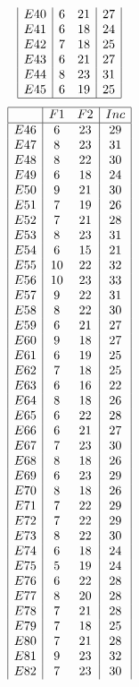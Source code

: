 \documentclass[12pt]{article}
\begin{document}
\begin{multicols}{3}
\begin{equation*}
\begin{array}{|c|cc|c|}
E40&6&21&27\\
E41&6&18&24\\
E42&7&18&25\\
E43&6&21&27\\
E44&8&23&31\\
E45&6&19&25\\
\hline
\end{array}
\end{equation*}
\begin{equation*}
\begin{array}{|c|cc|c|}
\hline
&F1&F2&Inc\\
\hline
E46&6&23&29\\
E47&8&23&31\\
E48&8&22&30\\
E49&6&18&24\\
E50&9&21&30\\
E51&7&19&26\\
E52&7&21&28\\
E53&8&23&31\\
E54&6&15&21\\
E55&10&22&32\\
E56&10&23&33\\
E57&9&22&31\\
E58&8&22&30\\
E59&6&21&27\\
E60&9&18&27\\
E61&6&19&25\\
E62&7&18&25\\
E63&6&16&22\\
E64&8&18&26\\
E65&6&22&28\\
E66&6&21&27\\
E67&7&23&30\\
E68&8&18&26\\
E69&6&23&29\\
E70&8&18&26\\
E71&7&22&29\\
E72&7&22&29\\
E73&8&22&30\\
E74&6&18&24\\
E75&5&19&24\\
E76&6&22&28\\
E77&8&20&28\\
E78&7&21&28\\
E79&7&18&25\\
E80&7&21&28\\
E81&9&23&32\\
E82&7&23&30\\

\end{array}
\end{equation*}
\end{multicols}
\end{document}
